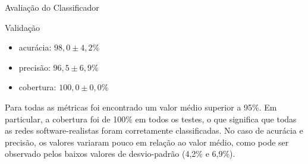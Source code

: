 \begin{section}{Avaliação do Classificador}
\begin{subsection}{Validação}

% 


		\begin{itemize}
			\item acurácia:  $98,0 \pm 4,2\%$
			\item precisão:  $96,5 \pm 6,9\%$
			\item cobertura: $100,0 \pm 0,0\%$
		\end{itemize}

		Para todas as métricas foi encontrado um valor médio superior a 95\%. Em particular, a cobertura foi de 100\% em todos os testes, o que significa que todas as redes software-realistas foram corretamente classificadas. No caso de acurácia e precisão, os valores variaram pouco em relação ao valor médio, como pode ser observado pelos baixos valores de desvio-padrão (4,2\% e 6,9\%).


\end{subsection}
\end{section}
